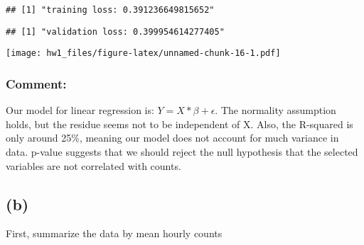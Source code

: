 \documentclass[]{article}
\newenvironment{Shaded}{\begin{snugshade}}{\end{snugshade}}
\newcommand{\KeywordTok}[1]{\textcolor[rgb]{0.13,0.29,0.53}{\textbf{#1}}}
\newcommand{\DataTypeTok}[1]{\textcolor[rgb]{0.13,0.29,0.53}{#1}}
\newcommand{\DecValTok}[1]{\textcolor[rgb]{0.00,0.00,0.81}{#1}}
\newcommand{\StringTok}[1]{\textcolor[rgb]{0.31,0.60,0.02}{#1}}
\newcommand{\OperatorTok}[1]{\textcolor[rgb]{0.81,0.36,0.00}{\textbf{#1}}}
\newcommand{\NormalTok}[1]{#1}
\begin{document}
\begin{verbatim}
## [1] "training loss: 0.391236649815652"
\end{verbatim}

\begin{Shaded}
\end{Shaded}

\begin{verbatim}
## [1] "validation loss: 0.399954614277405"
\end{verbatim}

\begin{Shaded}
\end{Shaded}

\texttt{[image: hw1\_files/figure-latex/unnamed-chunk-16-1.pdf]}

\subsubsection{Comment:}\label{comment-2}

Our model for linear regression is: \(Y = X*\beta + \epsilon\). The
normality assumption holds, but the residue seems not to be independent
of X. Also, the R-squared is only around 25\%, meaning our model does
not account for much variance in data. p-value suggests that we should
reject the null hypothesis that the selected variables are not
correlated with counts.

\subsection{(b)}\label{b-2}

First, summarize the data by mean hourly counts
\end{document}
